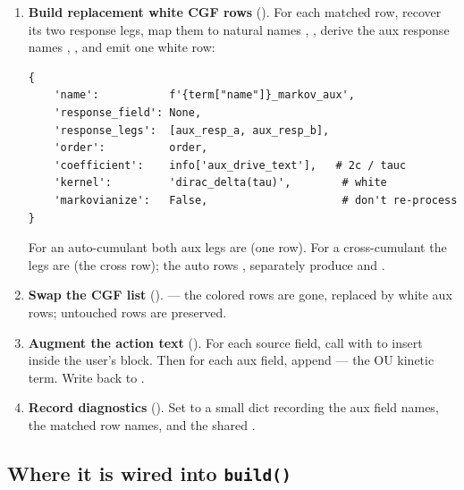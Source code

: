 \begin{enumerate}
  \item \textbf{Build replacement white CGF rows}
        (). For each matched
        row, recover its two response legs, map them to natural names
        , , derive the aux response names
        , , and emit one white row:
\begin{lstlisting}
{
    'name':           f'{term["name"]}_markov_aux',
    'response_field': None,
    'response_legs':  [aux_resp_a, aux_resp_b],
    'order':          order,
    'coefficient':    info['aux_drive_text'],   # 2c / tauc
    'kernel':         'dirac_delta(tau)',        # white
    'markovianize':   False,                     # don't re-process
}
\end{lstlisting}
        For an auto-cumulant \code{[xt, xt]} both aux legs are  (one
        row). For a cross-cumulant \code{[xt, yt]} the legs are 
        (the cross row); the auto rows ,  separately produce
         and .

  \item \textbf{Swap the CGF list}
        ().
         --- the
        colored rows are gone, replaced by white aux rows; untouched rows are
        preserved.

  \item \textbf{Augment the action text}
        (). For each source
        field, call  with  to insert
         inside the user's  block. Then for each aux
        field, append 
        --- the OU kinetic term. Write back to .

  \item \textbf{Record diagnostics}
        (). Set
         to a small dict recording the aux
        field names, the matched row names, and the shared .
\end{enumerate}

\subsection{Where it is wired into \texttt{build()}}

